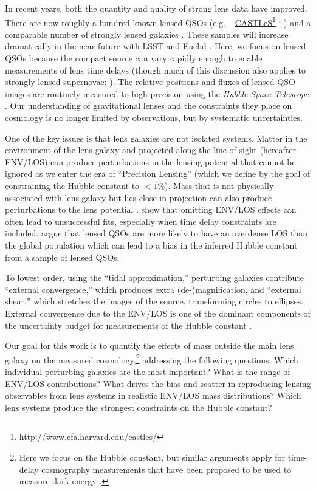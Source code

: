 \documentclass{emulateapj}
\newcommand\fnurl[2]{%
\href{#2}{#1}\footnote{\url{#2}}%
}
\begin{document}
In recent years, both the quantity and quality of strong lens data have improved. There are now roughly a hundred known lensed QSOs (e.g.,\ \fnurl{CASTLeS}{http://www.cfa.harvard.edu/castles/}; \citealt{SQLS,CLASS}) and a comparable number of strongly lensed galaxies \citep[e.g.,][]{Bolton08,Cassowary}. These samples will increase dramatically in the near future with LSST and Euclid \citep[e.g.,][]{LSST, Coe09, Refregier10, Oguri10, Collett15}. Here, we focus on lensed QSOs because the compact source can vary rapidly enough to enable measurements of lens time delays (though much of this discussion also applies to strongly lensed supernovae; \citealt{Kelly15, Kelly16, Rodney16}). The relative positions and fluxes of lensed QSO images are routinely measured to high precision using the \textit{Hubble Space Telescope} \citep[e.g,.][and references therein; CASTLeS Collaboration]{Lehar00,Sluse12}. Our understanding of gravitational lenses and the constraints they place on cosmology is no longer limited by observations, but by systematic uncertainties. 

One of the key issues is that lens galaxies are not isolated systems. Matter in the environment of the lens galaxy and projected along the line of sight (hereafter ENV/LOS) can produce perturbations in the lensing potential that cannot be ignored as we enter the era of ``Precision Lensing'' (which we define by the goal of constraining the Hubble constant to $<1\%$). Mass that is not physically associated with lens galaxy but lies close in projection can also produce perturbations to the lens potential \citep[e.g.,][]{Bar-Kana96,Momcheva06,Wong11, Collett16}. \citet{Jaroszynski14} show that omitting ENV/LOS effects can often lead to unsuccessful fits, especially when time delay constraints are included. \citet{Collett16} argue that lensed QSOs are more likely to have an overdense LOS than the global population which can lead to a bias in the inferred Hubble constant from a sample of lensed QSOs.

To lowest order, using the ``tidal approximation,'' perturbing galaxies contribute ``external convergence,'' which produces extra (de-)magnification, and ``external shear,'' which stretches the images of the source, transforming circles to ellipses. External convergence due to the ENV/LOS is one of the dominant components of the uncertainty budget for measurements of the Hubble constant \citep{Suyu12}.

Our goal for this work is to quantify the effects of mass outside the main lens galaxy on the measured cosmology,\footnote{Here we focus on the Hubble constant, but similar arguments apply for time-delay cosmography measurements that have been proposed to be used to measure dark energy \citep{Treu13}.} addressing the following questions:
Which individual perturbing galaxies are the most important?
What is the range of ENV/LOS contributions?
What drives the bias and scatter in reproducing lensing observables from lens systems in realistic ENV/LOS mass distributions?
Which lens systems produce the strongest constraints on the Hubble constant?
\end{document}
